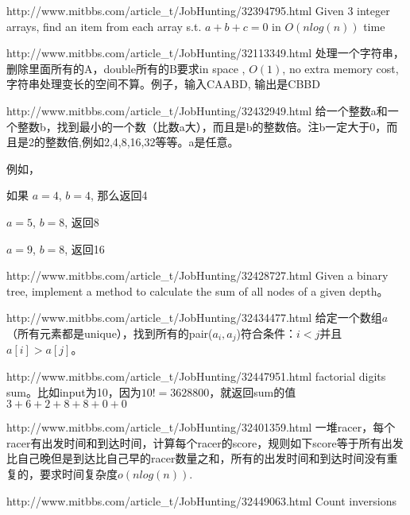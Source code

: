 \documentclass[a4paper]{article}
\begin{document}
\begin{CJK}{UTF8}{gbsn}
\begin{enumerate}
\begin{Q}[Facebook]{http://www.mitbbs.com/article_t/JobHunting/32394795.html}
Given 3 integer arrays, find an item from each array s.t. $a+b+c=0$ in $O(nlog(n))$ time
\end{Q}

\begin{Q}[Google]{http://www.mitbbs.com/article_t/JobHunting/32113349.html}
处理一个字符串，删除里面所有的A，double所有的B要求in space , $O(1)$, no extra memory cost, 字符串处理变长的空间不算。例子，输入CAABD, 输出是CBBD
\end{Q}

\begin{Q}[Google]{http://www.mitbbs.com/article_t/JobHunting/32432949.html}
给一个整数a和一个整数b，找到最小的一个数（比数a大），而且是b的整数倍。注b一定大于0，而且是2的整数倍,例如2,4,8,16,32等等。a是任意。

例如，

如果 $a = 4$, $b = 4$, 那么返回4

$a = 5$, $b = 8$, 返回8

$a = 9$, $b = 8$, 返回16
\end{Q}

\begin{Q}[TripAdvisor]{http://www.mitbbs.com/article_t/JobHunting/32428727.html}
Given a binary tree, implement a method to calculate the sum of all nodes of a given depth。
\end{Q}

\begin{Q}{http://www.mitbbs.com/article_t/JobHunting/32434477.html}
给定一个数组$a$（所有元素都是unique），找到所有的pair($a_i, a_j$)符合条件：$i < j$并且 $a[i] > a[j]$。
\end{Q}

\begin{Q}[Linkedin]{http://www.mitbbs.com/article_t/JobHunting/32447951.html}
factorial digits sum。比如input为10，因为$10! = 3628800$，就返回sum的值$3+6+2+8+8+0+0$
\end{Q}

\begin{Q}[RocketFuel]{http://www.mitbbs.com/article_t/JobHunting/32401359.html}
一堆racer，每个racer有出发时间和到达时间，计算每个racer的score，规则如下score等于所有出发比自己晚但是到达比自己早的racer数量之和，所有的出发时间和到达时间没有重复的，要求时间复杂度$o(nlog(n))$.
\end{Q}

\begin{Q}[Google]{http://www.mitbbs.com/article_t/JobHunting/32449063.html}
Count inversions
\end{Q}


\end{enumerate}
\end{CJK}
\end{document}
